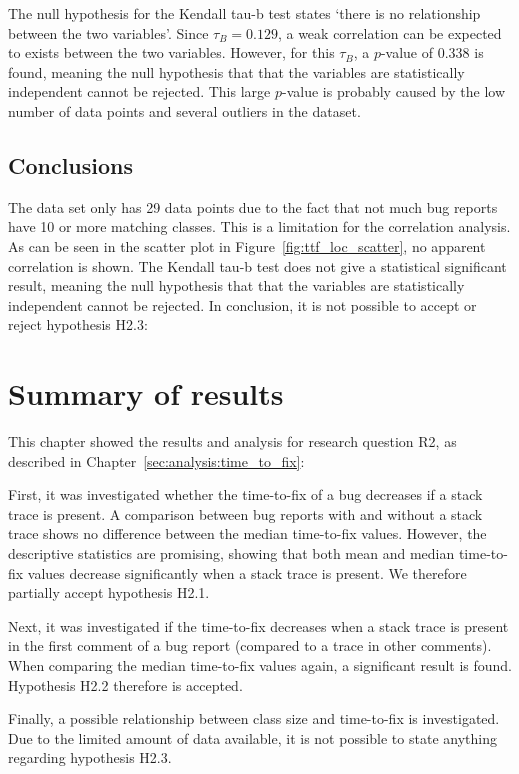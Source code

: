 The null hypothesis for the Kendall tau-b test states `there is no relationship between the two variables'. Since $\tau_B = 0.129$, a weak correlation can be expected to exists between the two variables. However, for this $\tau_B$, a $p$-value of 0.338 is found, meaning the null hypothesis that that the variables are statistically independent cannot be rejected. This large $p$-value is probably caused by the low number of data points and several outliers in the dataset.


\subsection{Conclusions} %
The data set only has 29 data points due to the fact that not much bug reports have 10 or more matching classes. This is a limitation for the correlation analysis. As can be seen in the scatter plot in Figure~\ref{fig:ttf_loc_scatter}, no apparent correlation is shown. The Kendall tau-b test does not give a statistical significant result, meaning the null hypothesis that that the variables are statistically independent cannot be rejected. In conclusion, it is not possible to accept or reject hypothesis H2.3: 

\vspace{\baselineskip}
\hypbc{}



\section{Summary of results} %
\label{sec:ttf_summary_of_results}
This chapter showed the results and analysis for research question R2, as described in Chapter~\ref{sec:analysis:time_to_fix}:

\vspace{\baselineskip}
\questionb{}
\vspace{\baselineskip}

\noindent
First, it was investigated whether the time-to-fix of a bug decreases if a stack trace is present. A comparison between bug reports with and without a stack trace shows no difference between the median time-to-fix values. However, the descriptive statistics are promising, showing that both mean and median time-to-fix values decrease significantly when a stack trace is present. We therefore partially accept hypothesis H2.1.

Next, it was investigated if the time-to-fix decreases when a stack trace is present in the first comment of a bug report (compared to a trace in other comments). When comparing the median time-to-fix values again, a significant result is found. Hypothesis H2.2 therefore is accepted.

Finally, a possible relationship between class size and time-to-fix is investigated. Due to the limited amount of data available, it is not possible to state anything regarding hypothesis H2.3.

